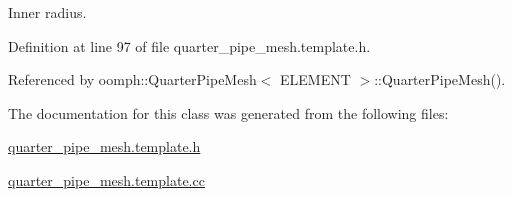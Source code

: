 Inner radius. 



Definition at line 97 of file quarter\+\_\+pipe\+\_\+mesh.\+template.\+h.



Referenced by oomph\+::\+Quarter\+Pipe\+Mesh$<$ E\+L\+E\+M\+E\+N\+T $>$\+::\+Quarter\+Pipe\+Mesh().



The documentation for this class was generated from the following files\+:\begin{DoxyCompactItemize}
\item 
\hyperlink{quarter__pipe__mesh_8template_8h}{quarter\+\_\+pipe\+\_\+mesh.\+template.\+h}\item 
\hyperlink{quarter__pipe__mesh_8template_8cc}{quarter\+\_\+pipe\+\_\+mesh.\+template.\+cc}\end{DoxyCompactItemize}
